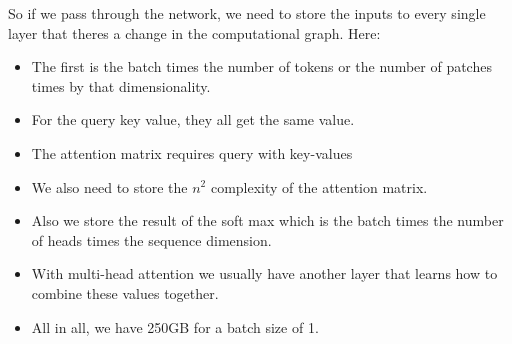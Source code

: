 \documentclass[11pt]{article}
\begin{document}
\begin{minipage}[l]{.5\linewidth}
    \begin{figure}[H]
        \centering
    \end{figure}    
\end{minipage}\hfill
\begin{minipage}[r]{.48\linewidth}
    So if we pass through the network, we need to store the inputs to every single layer that theres a change in the computational graph. Here:
    \begin{itemize}
        \item The first is the batch times the number of tokens or the number of patches times by that dimensionality.
        \item For the query key value, they all get the same value.
        \item The attention matrix requires query with key-values
        \item We also need to store the $n^2$ complexity of the attention matrix. 
    \end{itemize}
\end{minipage}

\begin{itemize}
    \item Also we store the result of the soft max which is the batch times the number of heads times the sequence dimension.
    \item With multi-head attention we usually have another layer that learns how to combine these values together.
    \item All in all, we have 250GB for a batch size of 1. 
\end{itemize}
\end{document}
